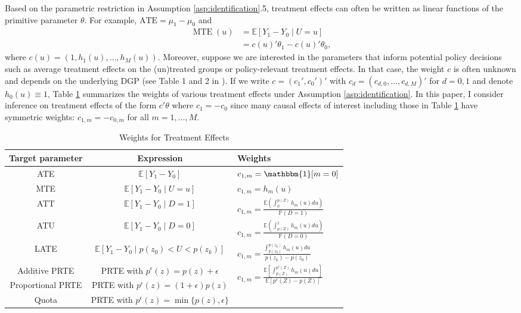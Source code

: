 \documentclass[11pt]{article}
\theoremstyle{definition}
\DeclareMathOperator*{\MTE}{MTE}
\newcommand{\Exp}{\ensuremath{\mathbb{E}}} %
\newcommand{\Prob}{\ensuremath{\mathbb{P}}} %
\newcommand{\0}{\ensuremath{\mathbf{0}}}
\newcommand{\indicator}{\ensuremath{\mathbbm{1}}}
\begin{document}
\begin{bibunit}
Based on the parametric restriction in Assumption \ref{asp:identification}.5, treatment effects can often be written as linear functions of the primitive parameter $\theta$. For example, $\text{ATE} = \mu_1 - \mu_0$ and 
\begin{align*}
	\MTE(u) 
    &= \Exp[Y_1 - Y_0\mid U=u] \\
    &= c(u)'\theta_1 - c(u)'\theta_0,
\end{align*}
where $c(u) = (1, h_1(u),\ldots,h_M(u))$. 
Moreover, suppose we are interested in the parameters that inform potential policy decisions such as average treatment effects on the (un)treated groups or policy-relevant treatment effects. In that case, the weight $c$ is often unknown and depends on the underlying DGP (see Table 1 and 2 in \cite{mogstad/torgovitsky:2018}). If we write $c = (c_1', c_0')'$ with $c_{d} = (c_{d,0},\ldots,c_{d,M})'$ for $d = 0,1$ and denote $h_0(u) \equiv 1$, Table \ref{tab:treatment-effects-weight} summarizes the weights of various treatment effects under Assumption \ref{asp:identification}. In this paper, I consider inference on treatment effects of the form $c'\theta$ where $c_1 = -c_0$ since many causal effects of interest including those in Table \ref{tab:treatment-effects-weight} have symmetric weights: $c_{1,m} = -c_{0,m}$ for all $m = 1,\ldots,M$.
\begin{table}[ht]
\centering 
\caption{Weights for Treatment Effects}
\label{tab:treatment-effects-weight}
\begin{tabular}{ccl}
	\toprule
	Target parameter	& Expression 	&  Weights \\
	\midrule
	ATE &	 $\Exp[Y_1 - Y_0]$ & $c_{1,m} = \indicator[m=0]$ \\
	MTE & $\Exp[Y_1 - Y_0\mid U=u]$ & $c_{1,m} = h_m(u)$\\
	ATT & $\Exp[Y_1 - Y_0\mid D=1]$ & $c_{1,m} = \frac{\Exp(\int_0^{p(Z)}h_m(u)du)}{\Prob(D=1)}$ \\
	ATU & $\Exp[Y_1 - Y_0\mid D=0]$ & $c_{1,m} = \frac{\Exp(\int_{p(Z)}^1 h_m(u)du)}{\Prob(D=0)}$ \\
	LATE & $\Exp[Y_1 - Y_0\mid p(z_0) < U < p(z_k)]$ & $c_{1,m} = \frac{\int_{p(z_0)}^{p(z_k)} h_m(u)du}{p(z_k) - p(z_0)}$  \\
    Additive PRTE & PRTE with $p^\epsilon(z) = p(z) + \epsilon$  &   \multirow{3}{*}{$c_{1,m} =  \frac{\Exp[\int_{p(Z)}^{p^\epsilon(Z)} h_m(u) du]}{\Exp[p^\epsilon(Z) - p(Z)]}$}  \\
    Proportional PRTE & PRTE with $p^\epsilon(z) = (1+\epsilon) p(z)$ & \\    
%
    Quota & PRTE with $p^\epsilon(z) = \min\{p(z),\epsilon\}$ & \\
    \bottomrule
\end{tabular}
\end{table} 


\end{bibunit}
\end{document}
